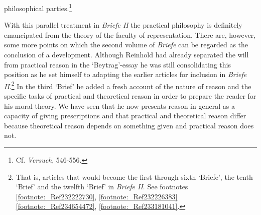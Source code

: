 philosophical parties.\footnote{ Cf. \textit{Versuch}, 546{-}556. } 

 With this parallel treatment in \textit{Briefe II }the practical philosophy is definitely emancipated from the theory of the faculty of representation. There are, however, some more points on which the second volume of \textit{Briefe} can be regarded as the conclusion of a development. Although Reinhold had already separated the will from practical reason in the `Beytrag'{-}essay he was still consolidating this position as he set himself to adapting the earlier articles for inclusion in \textit{Briefe II}.\footnote{ That is, articles that would become the first through sixth `Briefe', the tenth `Brief' and the twelfth `Brief' in \textit{Briefe II}. See footnotes \ref{footnote:_Ref232222730}, \ref{footnote:_Ref232226383}\ref{footnote:_Ref234654472}, \ref{footnote:_Ref233181041}.} In the third `Brief' he added a fresh account of the nature of reason and the specific tasks of practical and theoretical reason in order to prepare the reader for his moral theory. We have seen that he now presents reason in general as a capacity of giving prescriptions and that practical and theoretical reason differ because theoretical reason depends on something given and practical reason does not. 

